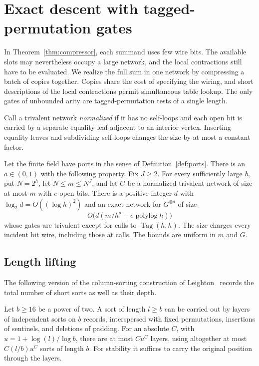 \section{Exact descent with tagged-permutation gates}\label{sec:exact}

In Theorem~\ref{thm:compressor}, each summand uses few wire bits. The
available slots may nevertheless occupy a large network, and the local
contractions still have to be evaluated. We realize the full sum in
one network by compressing a batch of copies together. Copies share
the cost of specifying the wiring, and short descriptions of the local
contractions permit simultaneous table lookup. The only gates of
unbounded arity are tagged-permutation tests of a single length.

Call a trivalent network \emph{normalized} if it has no self-loops and
each open bit is carried by a separate equality leaf adjacent to an
interior vertex. Inserting equality leaves and subdividing self-loops
changes the size by at most a constant factor.

\begin{proposition}
\label{prop:oracle-descent}
Let the finite field have ports in the sense of Definition~\ref{def:ports}.
There is an $a\in(0,1)$ with the following property. Fix $J\ge 2$.
For every sufficiently large $h$, put $N=2^h$, let $N\le m\le N^J$,
and let $G$ be
a normalized trivalent network of size at most $m$ with $e$ open bits.
There is a positive integer $d$ with $\log_2 d=O((\log h)^2)$ and an
exact network for $G^{\otimes d}$ of size
\[
                      O\bigl(d(m/h^a+e\operatorname{polylog} h)\bigr)
\]
whose gates are trivalent except for calls to $\operatorname{Tag}(h,h)$.
The size charges every incident bit wire, including those at calls.
The bounds are uniform in $m$ and $G$.
\end{proposition}

\subsection{Length lifting}
The following version of the column-sorting construction of
Leighton~\cite{Leighton} records the total number of short sorts as
well as their depth.
\begin{lemma}\label{lem:sort-lift}
Let $b\ge 16$ be a power of two. A sort of length $l\ge b$ can
be carried out by layers of independent sorts on $b$ records,
interspersed with fixed permutations, insertions of sentinels, and
deletions of padding. For an absolute $C$, with
$u=1+\log(l)/\log b$, there are at most $C u^C$ layers, using altogether
at most $C(l/b)u^C$ sorts of length $b$. For stability it suffices to
carry the original position through the layers.
\end{lemma}

